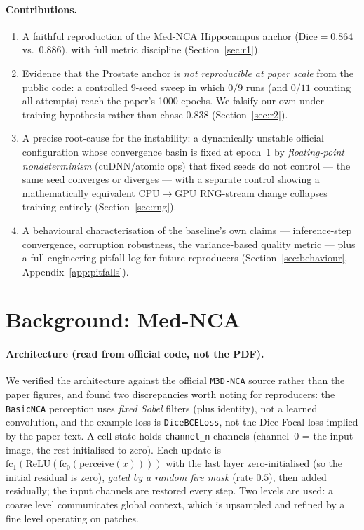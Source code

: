 \documentclass[10pt,twocolumn]{article}
\newcommand{\dice}{\mathrm{Dice}}
\begin{document}
\paragraph{Contributions.}
\begin{enumerate}[leftmargin=1.4em, itemsep=2pt]
  \item A faithful reproduction of the Med-NCA Hippocampus anchor
        ($\dice = 0.864$ vs.\ $0.886$), with full metric discipline
        (Section~\ref{sec:r1}).
  \item Evidence that the Prostate anchor is \emph{not reproducible at
        paper scale} from the public code: a controlled $9$-seed sweep in
        which $0/9$ runs (and $0/11$ counting all attempts) reach the
        paper's 1000 epochs. We falsify our own under-training hypothesis
        rather than chase $0.838$ (Section~\ref{sec:r2}).
  \item A precise root-cause for the instability: a dynamically unstable
        official configuration whose convergence basin is fixed at epoch~1 by
        \emph{floating-point nondeterminism} (cuDNN/atomic ops) that fixed
        seeds do not control --- the same seed converges or diverges --- with
        a separate control showing a mathematically equivalent
        CPU$\rightarrow$GPU RNG-stream change collapses training entirely
        (Section~\ref{sec:rng}).
  \item A behavioural characterisation of the baseline's own claims ---
        inference-step convergence, corruption robustness, the
        variance-based quality metric --- plus a full engineering pitfall
        log for future reproducers (Section~\ref{sec:behaviour},
        Appendix~\ref{app:pitfalls}).
\end{enumerate}

\section{Background: Med-NCA}
\label{sec:background}

\paragraph{Architecture (read from official code, not the PDF).}
We verified the architecture against the official \texttt{M3D-NCA} source
rather than the paper figures, and found two discrepancies worth noting for
reproducers: the \texttt{BasicNCA} perception uses \emph{fixed Sobel}
filters (plus identity), not a learned convolution, and the example loss is
\texttt{DiceBCELoss}, not the Dice-Focal loss implied by the paper text.
A cell state holds \texttt{channel\_n} channels (channel~0 = the input
image, the rest initialised to zero). Each update is
$\mathrm{fc}_1(\mathrm{ReLU}(\mathrm{fc}_0(\text{perceive}(x))))$ with the
last layer zero-initialised (so the initial residual is zero), \emph{gated
by a random fire mask} (rate $0.5$), then added residually; the input
channels are restored every step. Two levels are used: a coarse level
communicates global context, which is upsampled and refined by a fine level
operating on patches.
\end{document}
